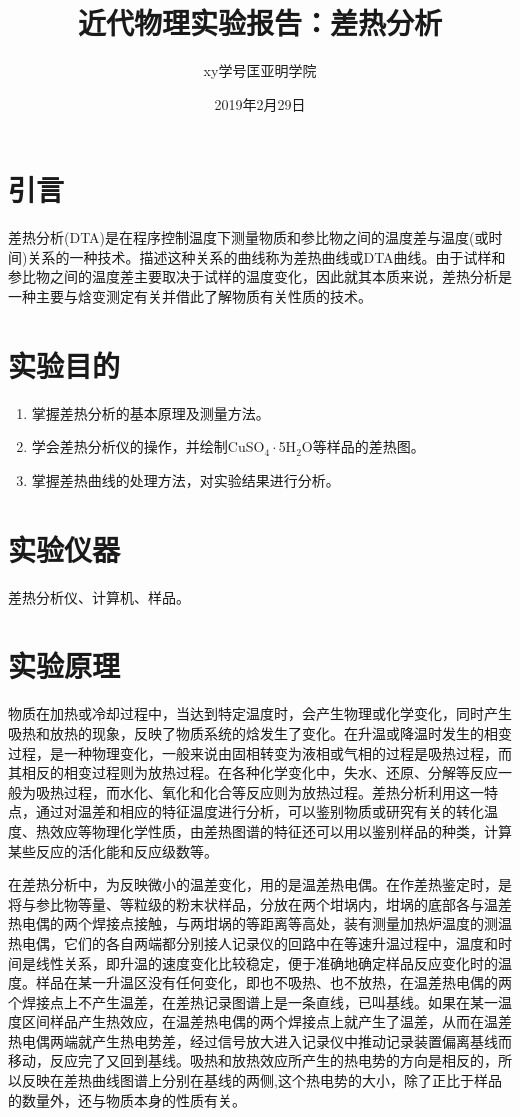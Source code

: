 \documentclass[a4paper]{article}
\title{近代物理实验报告：差热分析}
\author{xy\quad 学号\quad 匡亚明学院}
\date{2019年2月29日}
\begin{document}
\maketitle


\section{引言}
差热分析(DTA)是在程序控制温度下测量物质和参比物之间的温度差与温度(或时间)关系的一种技术。描述这种关系的曲线称为差热曲线或DTA曲线。由于试样和参比物之间的温度差主要取决于试样的温度变化，因此就其本质来说，差热分析是一种主要与焓变测定有关并借此了解物质有关性质的技术。

\section{实验目的}
\begin{enumerate}
\item 掌握差热分析的基本原理及测量方法。
\item 学会差热分析仪的操作，并绘制CuSO$_4\cdot$5H$_2$O等样品的差热图。
\item 掌握差热曲线的处理方法，对实验结果进行分析。
\end{enumerate}

\section{实验仪器}
差热分析仪、计算机、样品。

\section{实验原理}
物质在加热或冷却过程中，当达到特定温度时，会产生物理或化学变化，同时产生吸热和放热的现象，反映了物质系统的焓发生了变化。在升温或降温时发生的相变过程，是一种物理变化，一般来说由固相转变为液相或气相的过程是吸热过程，而其相反的相变过程则为放热过程。在各种化学变化中，失水、还原、分解等反应一般为吸热过程，而水化、氧化和化合等反应则为放热过程。差热分析利用这一特点，通过对温差和相应的特征温度进行分析，可以鉴别物质或研究有关的转化温度、热效应等物理化学性质，由差热图谱的特征还可以用以鉴别样品的种类，计算某些反应的活化能和反应级数等。

在差热分析中，为反映微小的温差变化，用的是温差热电偶。在作差热鉴定时，是将与参比物等量、等粒级的粉末状样品，分放在两个坩埚内，坩埚的底部各与温差热电偶的两个焊接点接触，与两坩埚的等距离等高处，装有测量加热炉温度的测温热电偶，它们的各自两端都分别接人记录仪的回路中在等速升温过程中，温度和时间是线性关系，即升温的速度变化比较稳定，便于准确地确定样品反应变化时的温度。样品在某一升温区没有任何变化，即也不吸热、也不放热，在温差热电偶的两个焊接点上不产生温差，在差热记录图谱上是一条直线，已叫基线。如果在某一温度区间样品产生热效应，在温差热电偶的两个焊接点上就产生了温差，从而在温差热电偶两端就产生热电势差，经过信号放大进入记录仪中推动记录装置偏离基线而移动，反应完了又回到基线。吸热和放热效应所产生的热电势的方向是相反的，所以反映在差热曲线图谱上分别在基线的两侧,这个热电势的大小，除了正比于样品的数量外，还与物质本身的性质有关。
\end{document}
